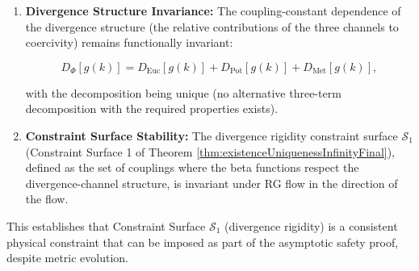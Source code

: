 \begin{theorem}
\begin{enumerate}
\item \textbf{Divergence Structure Invariance:} The coupling-constant dependence of the divergence structure (the relative contributions of the three channels to coercivity) remains functionally invariant:

\begin{equation}
D_\Phi[g(k)] = D_{\mathrm{Euc}}[g(k)] + D_{\mathrm{Pot}}[g(k)] + D_{\mathrm{Met}}[g(k)],
\end{equation}

with the decomposition being unique (no alternative three-term decomposition with the required properties exists).

\item \textbf{Constraint Surface Stability:} The divergence rigidity constraint surface $\mathcal{S}_1$ (Constraint Surface 1 of Theorem \ref{thm:existenceUniquenessInfinityFinal}),  defined as the set of couplings where the beta functions respect the divergence-channel structure, is invariant under RG flow in the direction of the flow.

\end{enumerate}

This establishes that Constraint Surface $\mathcal{S}_1$ (divergence rigidity) is a consistent physical constraint that can be imposed as part of the asymptotic safety proof, despite metric evolution.

\end{theorem}

